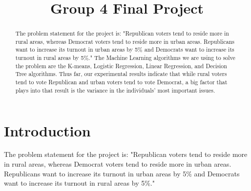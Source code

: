 \documentclass[conference]{IEEEtran}
\begin{document}
\title{Group 4 Final Project}

\author{
\and
{}
\and
{}
\and
{}
}

\maketitle


\begin{abstract}
The problem statement for the project is: "Republican voters tend to reside more in rural areas, whereas Democrat voters tend to 
reside more in urban areas. Republicans want to increase its turnout in urban areas by 5\% and Democrats want to increase its 
turnout in rural areas by 5\%." The Machine Learning algorithms we are using to solve the problem are the K-means, Logistic Regression,
Linear Regression, and Decision Tree algorithms. Thus far, our experimental results indicate that while rural voters tend to vote 
Republican and urban voters tend to vote Democrat, a big factor that plays into that result is the variance in the individuals' 
most important issues. 
\end{abstract}

\section{Introduction}
The problem statement for the project is: "Republican voters tend to reside more in rural areas, whereas Democrat voters tend to 
reside more in urban areas. Republicans want to increase its turnout in urban areas by 5\% and Democrats want to increase its 
turnout in rural areas by 5\%."
\end{document}
